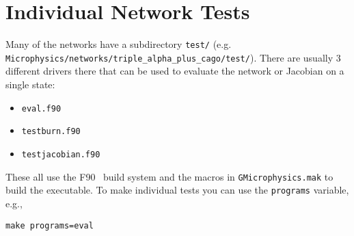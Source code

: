 \section{Individual Network Tests}

Many of the networks have a subdirectory {\tt test/} (e.g. {\tt
  Microphysics/networks/triple\_alpha\_plus\_cago/test/}).  There are
usually 3 different drivers there that can be used to evaluate the
network or Jacobian on a single state:
\begin{itemize}
  \item {\tt eval.f90}

  \item {\tt testburn.f90}

  \item {\tt testjacobian.f90}
\end{itemize}
These all use the F90 \amrex\ build system and the macros in 
{\tt GMicrophysics.mak} to build the executable.  To make 
individual tests you can use the {\tt programs} variable, e.g.,
\begin{verbatim}
make programs=eval
\end{verbatim}
